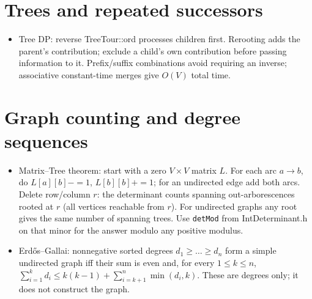 \section{Trees and repeated successors}
\begin{itemize}[nosep,leftmargin=*]
\item Tree DP: reverse TreeTour::ord processes children first. Rerooting
adds the parent's contribution; exclude a child's own contribution before
passing information to it. Prefix/suffix combinations avoid requiring an
inverse; associative constant-time merges give $O(V)$ total time.
\end{itemize}
\section{Graph counting and degree sequences}
\begin{itemize}[nosep,leftmargin=*]
\item Matrix--Tree theorem: start with a zero $V\times V$ matrix $L$.
For each arc $a\to b$, do $L[a][b]-=1$, $L[b][b]+=1$; for an undirected
edge add both arcs. Delete row/column $r$: the determinant counts spanning
out-arborescences rooted at $r$ (all vertices reachable from $r$).
For undirected graphs any root gives the same number of spanning trees.
Use \texttt{detMod} from IntDeterminant.h on that minor for the answer
modulo any positive modulus.
\item Erd\H{o}s--Gallai: nonnegative sorted degrees $d_1\ge\dots\ge d_n$
form a simple undirected graph iff their sum is even and, for every
$1\le k\le n$,
$\sum_{i=1}^k d_i\le k(k-1)+\sum_{i=k+1}^n\min(d_i,k)$.
These are degrees only; it does not construct the graph.
\end{itemize}
